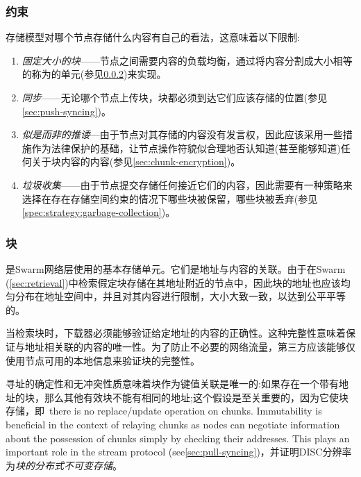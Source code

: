 \subsubsection{约束}
存储模型对哪个节点存储什么内容有自己的看法，这意味着以下限制: 

\begin{enumerate}
    \item \emph{固定大小的块}——节点之间需要内容的负载均衡，通过将内容分割成大小相等的称为的单元(参见\ref{sec:chunks})来实现。
    \item \emph{同步}——无论哪个节点上传块，块都必须到达它们应该存储的位置(参见\ref{sec:push-syncing})。
    \item \emph{似是而非的推诿}—由于节点对其存储的内容没有发言权，因此应该采用一些措施作为法律保护的基础，让节点操作符貌似合理地否认知道(甚至能够知道)任何关于块内容的内容(参见\ref{sec:chunk-encryption})。
    \item \emph{垃圾收集}——由于节点提交存储任何接近它们的内容，因此需要有一种策略来选择在存在存储空间约束的情况下哪些块被保留，哪些块被丢弃(参见\ref{spec:strategy:garbage-collection})。 
\end{enumerate}

\subsubsection{块}\label{sec:chunks}

是Swarm网络层使用的基本存储单元。它们是地址与内容的关联。由于在Swarm (\ref{sec:retrieval})中检索假定块存储在其地址附近的节点中，因此块的地址也应该均匀分布在地址空间中，并且对其内容进行限制，大小大致一致，以达到公平平等的。

当检索块时，下载器必须能够验证给定地址的内容的正确性。这种完整性意味着保证与地址相关联的内容的唯一性。为了防止不必要的网络流量，第三方应该能够仅使用节点可用的本地信息来验证块的完整性。

寻址的确定性和无冲突性质意味着块作为键值关联是唯一的:如果存在一个带有地址的块，那么其他有效块不能有相同的地址;这个假设是至关重要的，因为它使块存储，即\ there is no replace/update operation on chunks. Immutability is beneficial in the context of relaying chunks as nodes can negotiate information about the possession of chunks simply by checking their addresses. This plays an important role in the stream protocol (see\ref{sec:pull-syncing})，并证明DISC分辨率为\emph{块的分布式不可变存储}。

